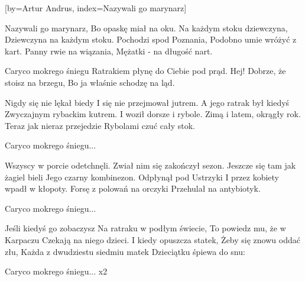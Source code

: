 [by={Artur Andrus},
                     index={Nazywali go marynarz}]
\beginverse

Nazywali go marynarz,
Bo opaskę miał na oku.
Na każdym stoku dziewczyna,
Dziewczyna na każdym stoku.
Pochodzi spod Poznania,
Podobno umie wróżyć z kart.
Panny rwie na wiązania,
Mężatki - na długość nart.

\endverse
\beginverse

Caryco mokrego śniegu
Ratrakiem płynę do Ciebie pod prąd.
Hej!
Dobrze, że stoisz na brzegu,
Bo ja właśnie schodzę na ląd.

\endverse
\beginverse

Nigdy się nie lękał biedy
I się nie przejmował jutrem.
A jego ratrak był kiedyś
Zwyczajnym rybackim kutrem.
I woził dorsze i rybole.
Zimą i latem, okrągły rok.
Teraz jak nieraz przejedzie
Rybolami czuć cały stok.

\endverse
\beginverse

Caryco mokrego śniegu...

\endverse
\beginverse

Wszyscy w porcie odetchnęli.
Zwiał nim się zakończył sezon.
Jeszcze się tam jak żagiel bieli
Jego czarny kombinezon.
Odpłynął pod Ustrzyki
I przez kobiety wpadł w kłopoty.
Forsę z polowań na orczyki
Przehulał na antybiotyk.

\endverse
\beginverse

Caryco mokrego śniegu...

\endverse
\beginverse

Jeśli kiedyś go zobaczysz
Na ratraku w podłym świecie,
To powiedz mu, że w Karpaczu
Czekają na niego dzieci.
I kiedy opuszcza statek,
Żeby się znowu oddać złu,
Każda z dwudziestu siedmiu matek
Dzieciątku śpiewa do snu:

\endverse
\beginverse

Caryco mokrego śniegu... x2

\endverse
\endsong
